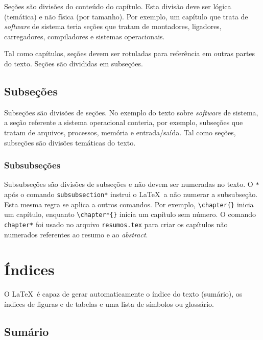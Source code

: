 Seções são divisões do conteúdo do capítulo. Esta divisão
deve ser lógica (temática) e não física (por tamanho).
Por exemplo, um capítulo que trata de \textit{software}
de sistema teria seções que tratam de montadores, ligadores,
carregadores, compiladores e sistemas operacionais.

Tal como capítulos, seções devem ser rotuladas para referência
em outras partes do texto. Seções são divididas em subseções.

\subsection{Subseções}
\label{Sec:subsecoes}

Subseções são divisões de seções. No exemplo do texto sobre
\textit{software} de sistema, a seção referente a sistema operacional
conteria, por exemplo, subseções que tratam de arquivos, processos,
memória e entrada/saída.  Tal como seções, subseções são divisões
temáticas do texto.

\subsubsection*{Subsubseções}
\label{Sec:subsubsecoes}

Subsubseções são divisões de subseções e não devem ser numeradas no
texto. O \texttt{*} após o comando \texttt{subsubsection*} instrui
o \LaTeX\ a não numerar a subsubseção. Esta mesma regra se aplica
a outros comandos. Por exemplo, \verb|\chapter{}|
inicia um capítulo, enquanto \verb|\chapter*{}|
inicia um capítulo sem número. O comando \texttt{chapter*} foi
usado no arquivo \texttt{resumos.tex} para criar os capítulos não
numerados referentes ao resumo e ao \textit{abstract}.

\section{Índices}

O \LaTeX\ é capaz de gerar automaticamente o índice do texto
(sumário), os índices de figuras e de tabelas e uma lista de símbolos
ou glossário.

\subsection{Sumário}
\label{Sec:sumario}

